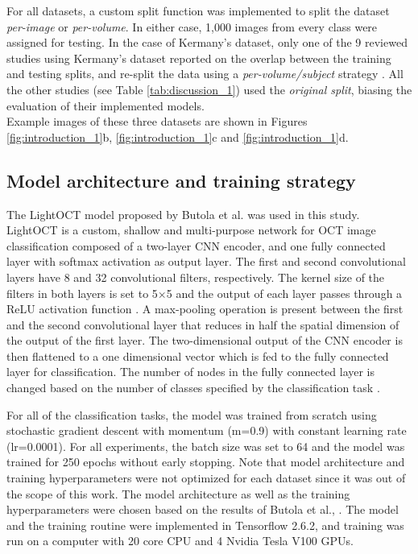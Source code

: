 \documentclass[fleqn,10pt]{wlscirep}
\begin{document}
For all datasets, a custom split function was implemented to split the dataset \textit{per-image} or \textit{per-volume}. In either case, 1,000 images from every class were assigned for testing.  In the case of Kermany's dataset, only one of the 9 reviewed studies using Kermany’s dataset reported on the overlap between the training and testing splits, and re-split the data using a \textit{per-volume/subject} strategy \cite{chetoui2020deep}. All the other studies (see Table \ref{tab:discussion_1}) used the \textit{original split}, biasing the evaluation of their implemented models. \\
Example images of these three datasets are shown in Figures \ref{fig:introduction_1}b,  \ref{fig:introduction_1}c and \ref{fig:introduction_1}d. 

\subsection*{Model architecture and training strategy}
The LightOCT model proposed by Butola et al. \cite{butola2020deep} was used in this study. LightOCT is a custom, shallow and multi-purpose network for OCT image classification composed of a two-layer CNN encoder, and one fully connected layer with softmax activation as output layer. The first and second convolutional layers have 8 and 32 convolutional filters, respectively. The kernel size of the filters in both layers is set to 5$\times$5 and the output of each layer passes through a ReLU activation function \cite{butola2020deep}. A max-pooling operation is present between the first and the second convolutional layer that reduces in half the spatial dimension of the output of the first layer. The two-dimensional output of the CNN encoder is then flattened to a one dimensional vector which is fed to the fully connected layer for classification. The number of nodes in the fully connected layer is changed based on the number of classes specified by the classification task \cite{butola2020deep}. 

For all of the classification tasks, the model was trained from scratch using stochastic gradient descent with momentum (m=0.9) with constant learning rate (lr=0.0001). For all experiments, the batch size was set to 64 and the model was trained for 250 epochs without early stopping. Note that model architecture and training hyperparameters were not optimized for each dataset since it was out of the scope of this work. The model architecture as well as the training hyperparameters were chosen based on the results of Butola et al., \cite{butola2020deep}. The model and the training routine were implemented in Tensorflow 2.6.2, and training was run on a computer with 20 core CPU and 4 Nvidia Tesla V100 GPUs. 
\end{document}

